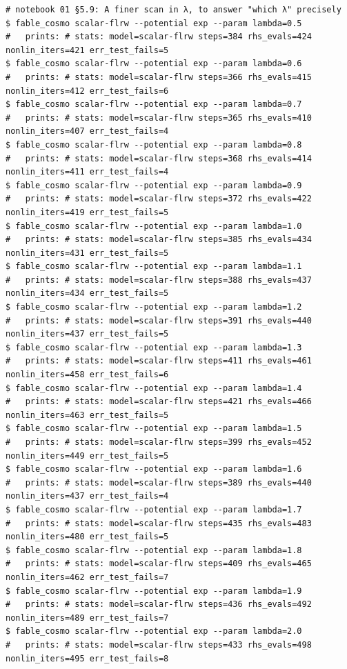 \begin{Verbatim}
# notebook 01 §5.9: A finer scan in λ, to answer "which λ" precisely
$ fable_cosmo scalar-flrw --potential exp --param lambda=0.5
#   prints: # stats: model=scalar-flrw steps=384 rhs_evals=424 nonlin_iters=421 err_test_fails=5
$ fable_cosmo scalar-flrw --potential exp --param lambda=0.6
#   prints: # stats: model=scalar-flrw steps=366 rhs_evals=415 nonlin_iters=412 err_test_fails=6
$ fable_cosmo scalar-flrw --potential exp --param lambda=0.7
#   prints: # stats: model=scalar-flrw steps=365 rhs_evals=410 nonlin_iters=407 err_test_fails=4
$ fable_cosmo scalar-flrw --potential exp --param lambda=0.8
#   prints: # stats: model=scalar-flrw steps=368 rhs_evals=414 nonlin_iters=411 err_test_fails=4
$ fable_cosmo scalar-flrw --potential exp --param lambda=0.9
#   prints: # stats: model=scalar-flrw steps=372 rhs_evals=422 nonlin_iters=419 err_test_fails=5
$ fable_cosmo scalar-flrw --potential exp --param lambda=1.0
#   prints: # stats: model=scalar-flrw steps=385 rhs_evals=434 nonlin_iters=431 err_test_fails=5
$ fable_cosmo scalar-flrw --potential exp --param lambda=1.1
#   prints: # stats: model=scalar-flrw steps=388 rhs_evals=437 nonlin_iters=434 err_test_fails=5
$ fable_cosmo scalar-flrw --potential exp --param lambda=1.2
#   prints: # stats: model=scalar-flrw steps=391 rhs_evals=440 nonlin_iters=437 err_test_fails=5
$ fable_cosmo scalar-flrw --potential exp --param lambda=1.3
#   prints: # stats: model=scalar-flrw steps=411 rhs_evals=461 nonlin_iters=458 err_test_fails=6
$ fable_cosmo scalar-flrw --potential exp --param lambda=1.4
#   prints: # stats: model=scalar-flrw steps=421 rhs_evals=466 nonlin_iters=463 err_test_fails=5
$ fable_cosmo scalar-flrw --potential exp --param lambda=1.5
#   prints: # stats: model=scalar-flrw steps=399 rhs_evals=452 nonlin_iters=449 err_test_fails=5
$ fable_cosmo scalar-flrw --potential exp --param lambda=1.6
#   prints: # stats: model=scalar-flrw steps=389 rhs_evals=440 nonlin_iters=437 err_test_fails=4
$ fable_cosmo scalar-flrw --potential exp --param lambda=1.7
#   prints: # stats: model=scalar-flrw steps=435 rhs_evals=483 nonlin_iters=480 err_test_fails=5
$ fable_cosmo scalar-flrw --potential exp --param lambda=1.8
#   prints: # stats: model=scalar-flrw steps=409 rhs_evals=465 nonlin_iters=462 err_test_fails=7
$ fable_cosmo scalar-flrw --potential exp --param lambda=1.9
#   prints: # stats: model=scalar-flrw steps=436 rhs_evals=492 nonlin_iters=489 err_test_fails=7
$ fable_cosmo scalar-flrw --potential exp --param lambda=2.0
#   prints: # stats: model=scalar-flrw steps=433 rhs_evals=498 nonlin_iters=495 err_test_fails=8


\end{Verbatim}
